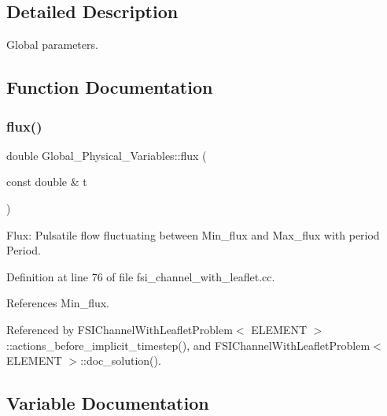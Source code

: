 \subsection{Detailed Description}
Global parameters. 

\subsection{Function Documentation}
\mbox{\label{namespaceGlobal__Physical__Variables_ad651484fe06209606bccefe6fe23be0c}} 
\subsubsection{\texorpdfstring{flux()}{flux()}}
{\footnotesize\ttfamily double Global\+\_\+\+Physical\+\_\+\+Variables\+::flux (\begin{DoxyParamCaption}\item[{const double \&}]{t }\end{DoxyParamCaption})}



Flux\+: Pulsatile flow fluctuating between Min\+\_\+flux and Max\+\_\+flux with period Period. 



Definition at line 76 of file fsi\+\_\+channel\+\_\+with\+\_\+leaflet.\+cc.



References Min\+\_\+flux.



Referenced by F\+S\+I\+Channel\+With\+Leaflet\+Problem$<$ E\+L\+E\+M\+E\+N\+T $>$\+::actions\+\_\+before\+\_\+implicit\+\_\+timestep(), and F\+S\+I\+Channel\+With\+Leaflet\+Problem$<$ E\+L\+E\+M\+E\+N\+T $>$\+::doc\+\_\+solution().



\subsection{Variable Documentation}
\mbox{\label{namespaceGlobal__Physical__Variables_af6e07423e22c0991084d9a2f43727805}} 
